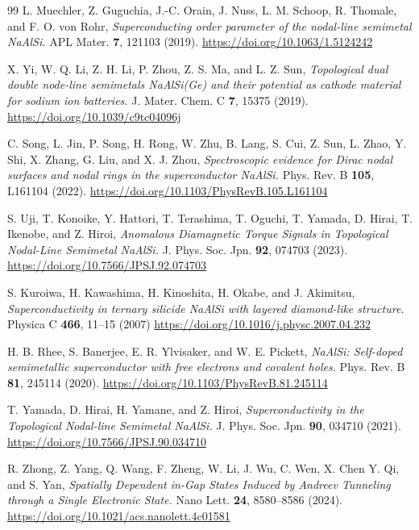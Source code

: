 \documentclass[reprint,superscriptaddress,prb,aps]{revtex4-2}
\begin{document}
\begin{thebibliography}{99}
L. Muechler, Z. Guguchia, J.-C. Orain, J. Nuss, L. M. Schoop, R. Thomale, and F. O. von Rohr,
\textit{Superconducting order parameter of the nodal-line semimetal NaAlSi.}
APL Mater. \textbf{7}, 121103 (2019).
\url{https://doi.org/10.1063/1.5124242}


X. Yi, W. Q. Li, Z. H. Li, P. Zhou, Z. S. Ma, and L. Z. Sun,
\textit{Topological dual double node-line semimetals NaAlSi(Ge) and their potential as cathode material for sodium ion batteries.}
J. Mater. Chem. C \textbf{7}, 15375 (2019).
\url{https://doi.org/10.1039/c9tc04096j}


C. Song, L. Jin, P. Song, H. Rong, W. Zhu, B. Lang, S. Cui, Z. Sun, L. Zhao, Y. Shi, X. Zhang, G. Liu, and X. J. Zhou,
\textit{Spectroscopic evidence for Dirac nodal surfaces and nodal rings in the superconductor NaAlSi.}
Phys. Rev. B \textbf{105}, L161104 (2022).
\url{https://doi.org/10.1103/PhysRevB.105.L161104}


S. Uji, T. Konoike, Y. Hattori, T. Terashima, T. Oguchi, T. Yamada, D. Hirai, T. Ikenobe, and Z. Hiroi,
\textit{Anomalous Diamagnetic Torque Signals in Topological Nodal-Line Semimetal NaAlSi.}
J. Phys. Soc. Jpn. \textbf{92}, 074703 (2023).
\url{https://doi.org/10.7566/JPSJ.92.074703}


S. Kuroiwa, H. Kawashima, H. Kinoshita, H. Okabe, and J. Akimitsu,
\textit{Superconductivity in ternary silicide NaAlSi with layered diamond-like structure.}
Physica C \textbf{466}, 11--15 (2007)
\url{https://doi.org/10.1016/j.physc.2007.04.232}


H. B. Rhee, S. Banerjee, E. R. Ylvisaker, and W. E. Pickett,
\textit{NaAlSi: Self-doped semimetallic superconductor with free electrons and covalent holes.}
Phys. Rev. B \textbf{81}, 245114 (2020).
\url{https://doi.org/10.1103/PhysRevB.81.245114}


T. Yamada, D. Hirai, H. Yamane, and Z. Hiroi,
\textit{Superconductivity in the Topological Nodal-line Semimetal NaAlSi.}
J. Phys. Soc. Jpn. \textbf{90}, 034710 (2021).
\url{https://doi.org/10.7566/JPSJ.90.034710}


R. Zhong, Z. Yang, Q. Wang, F. Zheng, W. Li, J. Wu, C. Wen, X. Chen Y. Qi, and S. Yan,
\textit{Spatially Dependent in-Gap States Induced by Andreev Tunneling through a Single Electronic State.}
Nano Lett. \textbf{24}, 8580--8586 (2024).
\url{https://doi.org/10.1021/acs.nanolett.4c01581}



\end{thebibliography}
\end{document}
